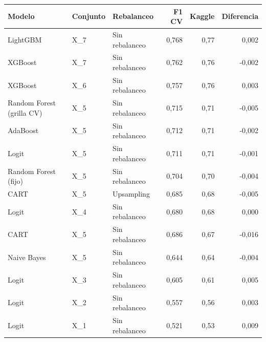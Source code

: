 
\begin{tabular}{lllrrr}
\toprule
Modelo & Conjunto & Rebalanceo & F1 CV & Kaggle & Diferencia\\
\midrule
LightGBM & X\_7 & Sin rebalanceo & 0,768 & 0,77 & 0,002\\
XGBoost & X\_7 & Sin rebalanceo & 0,762 & 0,76 & -0,002\\
XGBoost & X\_6 & Sin rebalanceo & 0,757 & 0,76 & 0,003\\
Random Forest (grilla CV) & X\_5 & Sin rebalanceo & 0,715 & 0,71 & -0,005\\
AdaBoost & X\_5 & Sin rebalanceo & 0,712 & 0,71 & -0,002\\
Logit & X\_5 & Sin rebalanceo & 0,711 & 0,71 & -0,001\\
Random Forest (fijo) & X\_5 & Sin rebalanceo & 0,704 & 0,70 & -0,004\\
CART & X\_5 & Upsampling & 0,685 & 0,68 & -0,005\\
Logit & X\_4 & Sin rebalanceo & 0,680 & 0,68 & 0,000\\
CART & X\_5 & Sin rebalanceo & 0,686 & 0,67 & -0,016\\
Naive Bayes & X\_5 & Sin rebalanceo & 0,644 & 0,64 & -0,004\\
Logit & X\_3 & Sin rebalanceo & 0,605 & 0,61 & 0,005\\
Logit & X\_2 & Sin rebalanceo & 0,557 & 0,56 & 0,003\\
Logit & X\_1 & Sin rebalanceo & 0,521 & 0,53 & 0,009\\
\bottomrule
\end{tabular}
